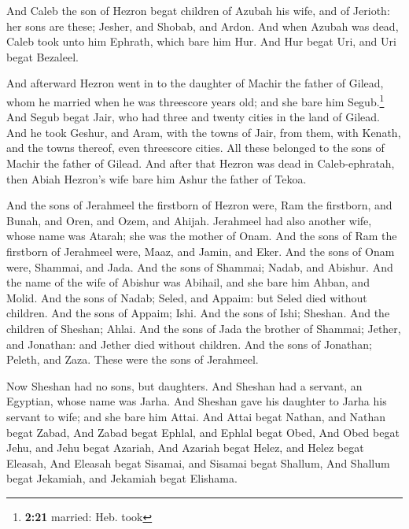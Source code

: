  And Caleb the son of Hezron begat children of Azubah his
wife, and of Jerioth: her sons are these; Jesher, and Shobab, and Ardon.
 And when Azubah was dead, Caleb took unto him Ephrath,
which bare him Hur.  And Hur begat Uri, and Uri begat
Bezaleel.

 And afterward Hezron went in to the daughter of Machir
the father of Gilead, whom he married when he was threescore years old;
and she bare him Segub.\footnote{\textbf{2:21} married: Heb. took}
 And Segub begat Jair, who had three and twenty cities in
the land of Gilead.  And he took Geshur, and Aram, with
the towns of Jair, from them, with Kenath, and the towns thereof, even
threescore cities. All these belonged to the sons of Machir the father
of Gilead.  And after that Hezron was dead in
Caleb-ephratah, then Abiah Hezron's wife bare him Ashur the father of
Tekoa.

 And the sons of Jerahmeel the firstborn of Hezron were,
Ram the firstborn, and Bunah, and Oren, and Ozem, and Ahijah.
 Jerahmeel had also another wife, whose name was Atarah;
she was the mother of Onam.  And the sons of Ram the
firstborn of Jerahmeel were, Maaz, and Jamin, and Eker. 
And the sons of Onam were, Shammai, and Jada. And the sons of Shammai;
Nadab, and Abishur.  And the name of the wife of Abishur
was Abihail, and she bare him Ahban, and Molid.  And the
sons of Nadab; Seled, and Appaim: but Seled died without children.
 And the sons of Appaim; Ishi. And the sons of Ishi;
Sheshan. And the children of Sheshan; Ahlai.  And the
sons of Jada the brother of Shammai; Jether, and Jonathan: and Jether
died without children.  And the sons of Jonathan; Peleth,
and Zaza. These were the sons of Jerahmeel.

 Now Sheshan had no sons, but daughters. And Sheshan had
a servant, an Egyptian, whose name was Jarha.  And
Sheshan gave his daughter to Jarha his servant to wife; and she bare him
Attai.  And Attai begat Nathan, and Nathan begat Zabad,
 And Zabad begat Ephlal, and Ephlal begat Obed,
 And Obed begat Jehu, and Jehu begat Azariah,
 And Azariah begat Helez, and Helez begat Eleasah,
 And Eleasah begat Sisamai, and Sisamai begat Shallum,
 And Shallum begat Jekamiah, and Jekamiah begat Elishama.


